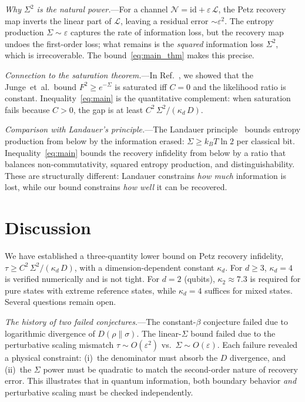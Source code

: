 \documentclass[prl,twocolumn,superscriptaddress,longbibliography,floatfix]{revtex4-2}
\newcommand{\id}{\mathrm{id}}
\newcommand{\chan}{\mathcal{N}}
\newcommand{\tauasym}{\tau}
\newcommand{\kd}{\kappa_d}
\begin{document}
\emph{Why $\Sigma^2$ is the natural power.}---For a
channel $\chan = \id + \varepsilon\,\mathcal{L}$, the
Petz recovery map inverts the linear part of
$\mathcal{L}$, leaving a residual error
$\sim \varepsilon^2$.
The entropy production $\Sigma \sim \varepsilon$ captures
the rate of information loss, but the recovery map
undoes the first-order loss; what remains is the
\emph{squared} information loss $\Sigma^2$, which is
irrecoverable.
The bound~\eqref{eq:main_thm} makes this precise.

\emph{Connection to the saturation theorem.}---In
Ref.~\cite{Huang2026}, we showed that the Junge~et~al.\
bound $F^2 \geq e^{-\Sigma}$ is saturated iff
$C = 0$ and the likelihood ratio is constant.
Inequality~\eqref{eq:main} is the quantitative
complement: when saturation fails because $C > 0$, the
gap is at least $C^2\,\Sigma^2/(\kd\,D)$.

\emph{Comparison with Landauer's principle.}---The
Landauer principle~\cite{Landauer1961,ReebWolf2014}
bounds entropy production from below by the information
erased: $\Sigma \geq k_B T \ln 2$ per classical bit.
Inequality~\eqref{eq:main} bounds the recovery
infidelity from below by a ratio that balances
non-commutativity, squared entropy production, and
distinguishability.
These are structurally different: Landauer constrains
\emph{how much} information is lost, while our bound
constrains \emph{how well} it can be recovered.

\section{Discussion}
\label{sec:discussion}

We have established a three-quantity lower bound on Petz
recovery infidelity, $\tauasym \geq C^2\,\Sigma^2
/(\kd\,D)$, with a dimension-dependent constant $\kd$.
For $d \geq 3$, $\kd = 4$ is verified numerically and
is not tight.
For $d = 2$ (qubits), $\kappa_2 \approx 7.3$ is
required for pure states with extreme reference states,
while $\kd = 4$ suffices for mixed states.
Several questions remain open.

\emph{The history of two failed conjectures.}---The
constant-$\beta$ conjecture failed due to logarithmic
divergence of $D(\rho\|\sigma)$.
The linear-$\Sigma$ bound failed due to the perturbative
scaling mismatch $\tauasym \sim O(\varepsilon^2)$ vs.\
$\Sigma \sim O(\varepsilon)$.
Each failure revealed a physical constraint: (i)~the
denominator must absorb the $D$ divergence, and
(ii)~the $\Sigma$ power must be quadratic to match the
second-order nature of recovery error.
This illustrates that in quantum information, both
boundary behavior \emph{and} perturbative scaling must
be checked independently.
\end{document}
